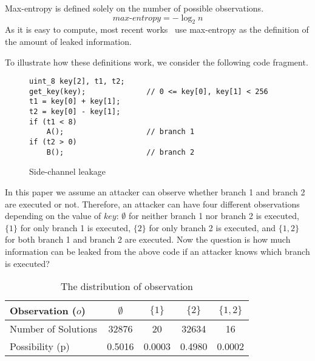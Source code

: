 Max-entropy is defined solely on the number of possible observations.
\begin{displaymath}
    \mathit{max\text{-}entropy} = -\log_2{n}
\end{displaymath}
As it is easy to compute, most recent works~\cite{182946,Doychev:2017:RAS:3062341.3062388} use max-entropy as the definition of
the amount of leaked information.

To illustrate how these definitions work, we consider the following code
fragment.

\begin{figure}[h!]
    \centering
    \begin{lstlisting}[xleftmargin=.03\textwidth,xrightmargin=.01\textwidth]
uint_8 key[2], t1, t2;
get_key(key);              // 0 <= key[0], key[1] < 256
t1 = key[0] + key[1];
t2 = key[0] - key[1];
if (t1 < 8) 
    A();                   // branch 1
if (t2 > 0)                
    B();                   // branch 2
\end{lstlisting}
\vspace*{-9pt}
    \caption{Side-channel leakage}
    \label{fig:side-channel}
\end{figure}
In this paper we assume an attacker can observe whether branch 1 and branch 2 are
executed or not. Therefore, an attacker can have four different observations
depending on the value of $\mathit{key}$: $\emptyset$ for neither branch 1 nor
branch 2 is executed, $\{1\}$ for only branch 1 is executed, $\{2\}$ for only branch 2 is
executed, and $\{1, 2\}$ for both branch 1 and branch 2 are executed. Now the
question is how much information can be leaked from the above code if an
attacker knows which branch is executed?

\begin{table}[ht]
    \centering\small\footnotesize
    \caption{The distribution of observation}\label{shtable}
    \vspace*{-9pt}
    \begin{tabular}{l|cccc}
        \hline
        Observation ($o$)   & $\emptyset$ & ${\{1\}}$ & ${\{2\}}$ & ${\{1, 2\}}$ \\ \hline
        Number of Solutions & 32876       & 20        & 32634     & 16           \\ \hline
        Possibility (p)     & 0.5016      & 0.0003    & 0.4980    & 0.0002       \\
        \hline
    \end{tabular}
\end{table}


